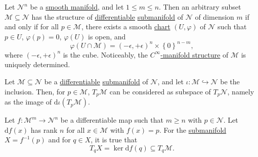 \begin{remark}
	Let \(\mathcal{N}^n \) be a \hyperref[def:smooth-manifold]{smooth manifold}, and let \(1 \leq m \leq n\). Then an arbitrary subset \(\mathcal{M} \subseteq \mathcal{N} \) has the structure of \hyperref[def:smooth-manifold]{differentiable} \hyperref[def:submanifold]{submanifold} of \(\mathcal{N} \) of dimension \(m\) if and only if for all \(p\in \mathcal{M}\), there exists a smooth \hyperref[def:coordinate-chart]{chart} \((U, \varphi )\) of \(\mathcal{N} \) such that \(p\in U\), \(\varphi (p) = 0\), \(\varphi (U)\) is open, and
	\[
		\varphi (U \cap \mathcal{M} ) = (-\epsilon , +\epsilon )^n \times \left\{0\right\} ^{n - m},
	\]
	where \((-\epsilon , +\epsilon )^n\) is the cube. Noticeably, the \hyperref[def:smooth-structure]{\(C^{\infty} \)-manifold structure} of \(\mathcal{M} \) is uniquely determined.
\end{remark}

\begin{remark}
	Let \(\mathcal{M} \subseteq \mathcal{N} \) be a \hyperref[def:smooth-manifold]{differentiable} \hyperref[def:submanifold]{submanifold} of \(\mathcal{N} \), and let \(\iota \colon \mathcal{M} \hookrightarrow \mathcal{N} \) be the inclusion. Then, for \(p\in \mathcal{M} \), \(T_p \mathcal{M} \) can be considered as subspace of \(T_p \mathcal{N} \), namely as the image of \(\mathrm{d} \iota (T_p \mathcal{M} )\).
\end{remark}

\begin{lemma}
	Let \(f\colon \mathcal{M}^m \to  \mathcal{N}^n \) be a differentiable map such that \(m \geq n\) with \(p\in \mathcal{N} \). Let \(\mathrm{d} f(x)\) has rank \(n\) for all \(x\in \mathcal{M} \) with \(f(x) = p\). For the \hyperref[def:submanifold]{submanifold} \(X = f^{-1} (p)\) and for \(q\in X\), it is true that
	\[
		T_q X = \ker \mathrm{d} f(q) \subseteq T_q \mathcal{M} .
	\]
\end{lemma}